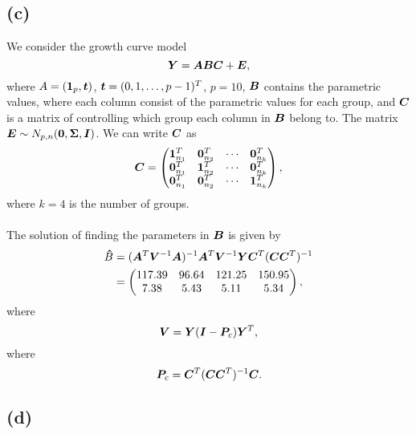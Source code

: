 \subsection*{(c)}
\label{sec:c-6}

We consider the growth curve model 
\begin{equation*}
  \bm{Y} = \bm{ABC} +  \bm{E},
\end{equation*}
where $A = (\bm{1}_{p},\bm{t})$, $\bm{t} = (0, 1, \dots, p - 1)^{T}$, $p =
10$,  $\bm{B}$ contains
the parametric values, where each column 
consist of the parametric values for each group,  and $\bm{C}$ is a
matrix of controlling which group each column in $\bm{B}$ belong to. The
matrix $\bm{E} \sim N_{p, n}(\bm{0}, \bm{\Sigma}, \bm{I})$. We can write $\bm{C}$ as
\begin{equation*}
  \bm{C} =
  \begin{pmatrix}
    \bm{1}_{n_{1}}^{T} & \bm{0}_{n_{2}}^{T} & \cdots & \bm{0}_{n_{k}}^{T} \\
    \bm{0}_{n_{1}}^{T} & \bm{1}_{n_{2}}^{T} & \cdots & \bm{0}_{n_{k}}^{T} \\
    \bm{0}_{n_{1}}^{T} & \bm{0}_{n_{2}}^{T} & \cdots & \bm{1}_{n_{k}}^{T}
  \end{pmatrix},
\end{equation*}
where $k = 4$ is the number of groups. \\
\\
The solution of finding the parameters in $\bm{B}$ is given by 
\begin{align*}
  \b \hat B &= (\b A^{T}\b V^{-1}\b A)^{-1}  \b A^{T}\b V^{-1}\b Y
              \b C^{T}(\b C\b C^{T})^{-1} %
  \\
  &=
  \begin{pmatrix}
    117.39 &96.64 &121.25 &150.95 \\ 
    7.38 &5.43 &5.11 &5.34
  \end{pmatrix},
\end{align*}
where
\begin{equation*}
  \bm{V} =  \bm{Y}  (\bm{I} - \bm{P}_{c})  \bm{Y}^{T},
\end{equation*}
where
\begin{equation*}
  \bm{P}_{c} = \bm{C}^{T}(\bm{C}\bm{C}^{T})^{-1}\bm{C}.
\end{equation*}

\subsection*{(d)}
\label{sec:d-2}

